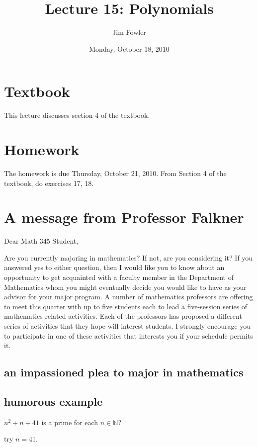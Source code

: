 \documentclass[12pt]{handout}
\title{Lecture 15: Polynomials}
\author{Jim Fowler}
\date{Monday, October 18, 2010}
\begin{document}
\maketitle

\section*{Textbook}

This lecture discusses section 4 of the textbook.

\section*{Homework} 

The homework is due Thursday, October 21, 2010.
From Section 4 of the textbook, do exercises 17, 18.

\section*{A message from Professor Falkner}

Dear Math 345 Student,

Are you currently majoring in mathematics?  If not, are you
considering it?  If you answered yes to either question, then I would
like you to know about an opportunity to get acquainted with a faculty
member in the Department of Mathematics whom you might eventually
decide you would like to have as your advisor for your major program.
A number of mathematics professors are offering to meet this quarter
with up to five students each to lead a five-session series of
mathematics-related activities.  Each of the professors has proposed a
different series of activities that they hope will interest students.
I strongly encourage you to participate in one of these activities
that interests you if your schedule permits it.

\subsection*{an impassioned plea to major in mathematics}

\subsection*{humorous example}

$n^2 + n + 41$ is a prime for each $n \in \mathbb{N}$?

try $n = 41$.
\end{document}
